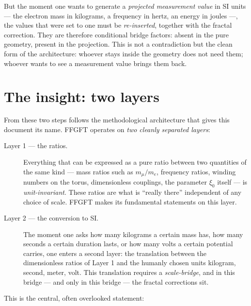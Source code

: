 But the moment one wants to generate a \emph{projected measurement
value} in SI units --- the electron mass in kilograms, a frequency in
hertz, an energy in joules ---, the values that were set to one must
be \emph{re-inserted}, together with the fractal correction. They are
therefore conditional bridge factors: absent in the pure geometry,
present in the projection. This is not a contradiction but the clean
form of the architecture: whoever stays inside the geometry does not
need them; whoever wants to see a measurement value brings them back.

\section{The insight: two layers}

From these two steps follows the methodological architecture that
gives this document its name. FFGFT operates on \emph{two cleanly
separated layers}:

\begin{description}
  \item[Layer 1 --- the ratios.] Everything that can be expressed as a
    pure ratio between two quantities of the same kind --- mass ratios
    such as $m_{\mu}/m_{e}$, frequency ratios, winding numbers on the
    torus, dimensionless couplings, the parameter $\xi_{0}$ itself ---
    is \emph{unit-invariant}. These ratios are what is ``really there''
    independent of any choice of scale. FFGFT makes its fundamental
    statements on this layer.

  \item[Layer 2 --- the conversion to SI.] The moment one asks how many
    kilograms a certain mass has, how many seconds a certain duration
    lasts, or how many volts a certain potential carries, one enters a
    second layer: the translation between the dimensionless ratios of
    Layer 1 and the humanly chosen units kilogram, second, meter, volt.
    This translation requires a \emph{scale-bridge}, and in this bridge
    --- and only in this bridge --- the fractal corrections sit.
\end{description}

This is the central, often overlooked statement:

\begin{center}
\end{center}

